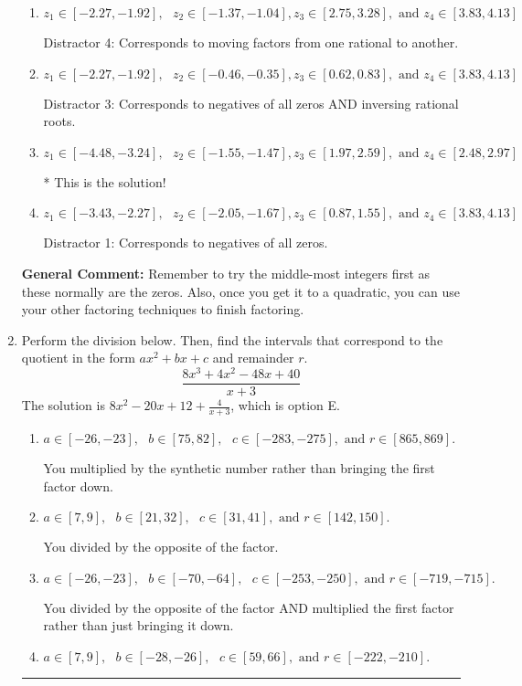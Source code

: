 \documentclass{extbook}[14pt]
\newcommand{\litem}[1]{\item #1

\rule{\textwidth}{0.4pt}}
\begin{document}
\begin{enumerate}
{\begin{enumerate}[label=\Alph*.]
 Distractor 2: Corresponds to inversing rational roots.
\item \( z_1 \in [-2.27, -1.92], \text{   }  z_2 \in [-1.37, -1.04], z_3 \in [2.75, 3.28], \text{   and   } z_4 \in [3.83, 4.13] \)

 Distractor 4: Corresponds to moving factors from one rational to another.
\item \( z_1 \in [-2.27, -1.92], \text{   }  z_2 \in [-0.46, -0.35], z_3 \in [0.62, 0.83], \text{   and   } z_4 \in [3.83, 4.13] \)

 Distractor 3: Corresponds to negatives of all zeros AND inversing rational roots.
\item \( z_1 \in [-4.48, -3.24], \text{   }  z_2 \in [-1.55, -1.47], z_3 \in [1.97, 2.59], \text{   and   } z_4 \in [2.48, 2.97] \)

* This is the solution!
\item \( z_1 \in [-3.43, -2.27], \text{   }  z_2 \in [-2.05, -1.67], z_3 \in [0.87, 1.55], \text{   and   } z_4 \in [3.83, 4.13] \)

 Distractor 1: Corresponds to negatives of all zeros.
\end{enumerate}

\textbf{General Comment:} Remember to try the middle-most integers first as these normally are the zeros. Also, once you get it to a quadratic, you can use your other factoring techniques to finish factoring.
}
\litem{
Perform the division below. Then, find the intervals that correspond to the quotient in the form $ax^2+bx+c$ and remainder $r$.
\[ \frac{8x^{3} +4 x^{2} -48 x + 40}{x + 3} \]The solution is \( 8x^{2} -20 x + 12 + \frac{4}{x + 3} \), which is option E.\begin{enumerate}[label=\Alph*.]
\item \( a \in [-26, -23], \text{   } b \in [75, 82], \text{   } c \in [-283, -275], \text{   and   } r \in [865, 869]. \)

 You multiplied by the synthetic number rather than bringing the first factor down.
\item \( a \in [7, 9], \text{   } b \in [21, 32], \text{   } c \in [31, 41], \text{   and   } r \in [142, 150]. \)

 You divided by the opposite of the factor.
\item \( a \in [-26, -23], \text{   } b \in [-70, -64], \text{   } c \in [-253, -250], \text{   and   } r \in [-719, -715]. \)

 You divided by the opposite of the factor AND multiplied the first factor rather than just bringing it down.
\item \( a \in [7, 9], \text{   } b \in [-28, -26], \text{   } c \in [59, 66], \text{   and   } r \in [-222, -210]. \)


\end{enumerate}}
\end{enumerate}
\end{document}
